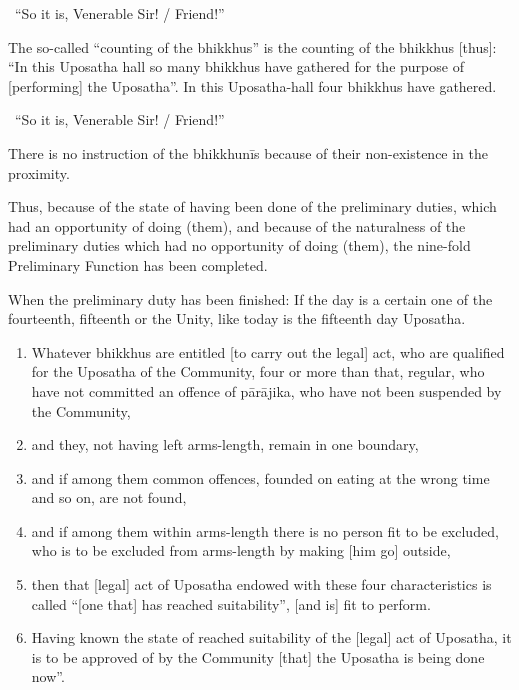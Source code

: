 \begin{center}
  \anglebracketleft\ \hspace{-0.5mm}``So it is, Venerable Sir! / Friend!'' \hspace{-0.5mm}\anglebracketright\
\end{center}

The so-called ``counting of the bhikkhus'' is the counting of the bhikkhus [thus]: ``In this Uposatha hall so many bhikkhus have gathered for the purpose of [performing] the Uposatha''. In this Uposatha-hall four bhikkhus have gathered.

\begin{center}
  \anglebracketleft\ \hspace{-0.5mm}``So it is, Venerable Sir! / Friend!'' \hspace{-0.5mm}\anglebracketright\
\end{center}

There is no instruction of the bhikkhunīs because of their non-existence in the proximity.

Thus, because of the state of having been done of the preliminary duties, which had an opportunity of doing (them), and because of the naturalness of the preliminary duties which had no opportunity of doing (them), the nine-fold Preliminary Function has been completed.

When the preliminary duty has been finished: If the day is a certain one of the fourteenth, fifteenth or the Unity, like today is the fifteenth day Uposatha.

\begin{enumerate}
  \item Whatever bhikkhus are entitled [to carry out the legal] act, who are qualified for the Uposatha of the Community, four or more than that, regular, who have not committed an offence of pārājika, who have not been suspended by the Community,
  \item and they, not having left arms-length, remain in one boundary,
  \item and if among them common offences, founded on eating at the wrong time and so on, are not found,
  \item and if among them within arms-length there is no person fit to be excluded, who is to be excluded from arms-length by making [him go] outside,
  \item then that [legal] act of Uposatha endowed with these four characteristics is called ``[one that] has reached suitability'', [and is] fit to perform.
  \item Having known the state of reached suitability of the [legal] act of Uposatha, it is to be approved of by the Community [that] the Uposatha is being done now''.
\end{enumerate}

